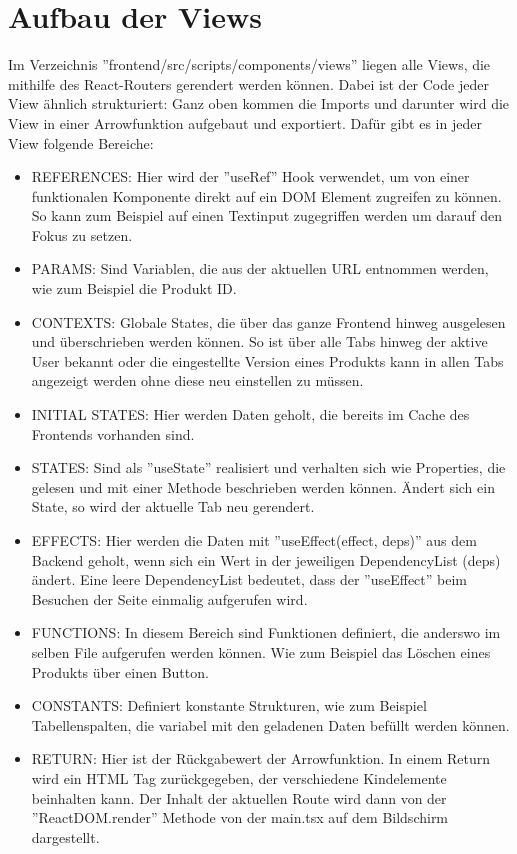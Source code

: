 \section{Aufbau der Views}
Im Verzeichnis ''frontend/src/scripts/components/views'' liegen alle Views, die mithilfe des React-Routers gerendert werden können. Dabei ist der Code jeder View ähnlich strukturiert: Ganz oben kommen die Imports und darunter wird die View in einer Arrowfunktion aufgebaut und exportiert. Dafür gibt es in jeder View folgende Bereiche:
\begin{itemize}
    \item REFERENCES: Hier wird der ''useRef'' Hook verwendet, um von einer funktionalen Komponente direkt auf ein DOM Element zugreifen zu können. So kann zum Beispiel auf einen Textinput zugegriffen werden um darauf den Fokus zu setzen.
    \item PARAMS: Sind Variablen, die aus der aktuellen URL entnommen werden, wie zum Beispiel die Produkt ID. 
	\item CONTEXTS: Globale States, die über das ganze Frontend hinweg ausgelesen und überschrieben werden können. So ist über alle Tabs hinweg der aktive User bekannt oder die eingestellte Version eines Produkts kann in allen Tabs angezeigt werden ohne diese neu einstellen zu müssen.
	\item INITIAL STATES: Hier werden Daten geholt, die bereits im Cache des Frontends vorhanden sind.
	\item STATES: Sind als ''useState'' realisiert und verhalten sich wie Properties, die gelesen und mit einer Methode beschrieben werden können. Ändert sich ein State, so wird der aktuelle Tab neu gerendert.
	\item EFFECTS: Hier werden die Daten mit ''useEffect(effect, deps)'' aus dem Backend geholt, wenn sich ein Wert in der jeweiligen DependencyList (deps) ändert. Eine leere DependencyList bedeutet, dass der ''useEffect'' beim Besuchen der Seite einmalig aufgerufen wird. 
	\item FUNCTIONS: In diesem Bereich sind Funktionen definiert, die anderswo im selben File aufgerufen werden können. Wie zum Beispiel das Löschen eines Produkts über einen Button.
	\item CONSTANTS: Definiert konstante Strukturen, wie zum Beispiel Tabellenspalten, die variabel mit den geladenen Daten befüllt werden können.
	\item RETURN: Hier ist der Rückgabewert der Arrowfunktion. In einem Return wird ein HTML Tag zurückgegeben, der verschiedene Kindelemente beinhalten kann. Der Inhalt der aktuellen Route wird dann von der ''ReactDOM.render'' Methode von der main.tsx auf dem Bildschirm dargestellt.
\end{itemize}
